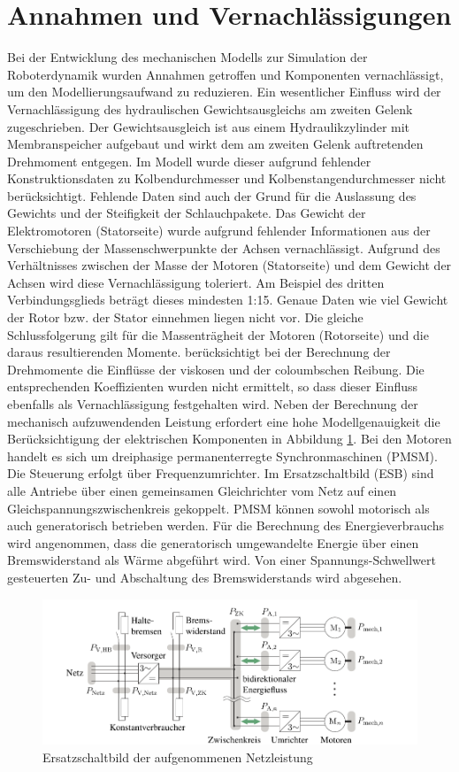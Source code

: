 \section{Annahmen und Vernachlässigungen}
Bei der Entwicklung des mechanischen Modells zur Simulation der Roboterdynamik wurden Annahmen getroffen und Komponenten vernachlässigt, um den Modellierungsaufwand zu reduzieren. Ein wesentlicher Einfluss wird der Vernachlässigung des hydraulischen Gewichtsausgleichs am zweiten Gelenk zugeschrieben. Der Gewichtsausgleich ist aus einem Hydraulikzylinder mit Membranspeicher aufgebaut und wirkt dem am zweiten Gelenk auftretenden Drehmoment entgegen. Im Modell wurde dieser aufgrund fehlender Konstruktionsdaten zu Kolbendurchmesser und Kolbenstangendurchmesser nicht berücksichtigt. Fehlende Daten sind auch der Grund für die Auslassung des Gewichts und der Steifigkeit der Schlauchpakete. Das Gewicht der Elektromotoren (Statorseite) wurde aufgrund fehlender Informationen aus der Verschiebung der Massenschwerpunkte der Achsen vernachlässigt. Aufgrund des Verhältnisses zwischen der Masse der Motoren (Statorseite) und dem Gewicht der Achsen  wird diese Vernachlässigung toleriert. Am Beispiel des dritten Verbindungsglieds beträgt dieses mindesten 1:15. Genaue Daten wie viel Gewicht der Rotor bzw. der Stator einnehmen liegen nicht vor.  Die gleiche Schlussfolgerung gilt für die Massenträgheit der Motoren (Rotorseite) und die daraus resultierenden Momente. \autocite[S.~287~f.]{Grimble.2009} berücksichtigt bei der Berechnung der Drehmomente die Einflüsse der viskosen und der coloumbschen Reibung. Die entsprechenden Koeffizienten wurden nicht ermittelt, so dass dieser Einfluss ebenfalls als Vernachlässigung festgehalten wird. Neben der Berechnung der mechanisch aufzuwendenden Leistung erfordert eine hohe Modellgenauigkeit die Berücksichtigung der elektrischen Komponenten in Abbildung \ref{fig:zk}. Bei den Motoren handelt es sich um dreiphasige permanenterregte Synchronmaschinen (PMSM).  Die Steuerung erfolgt über Frequenzumrichter. Im Ersatzschaltbild (ESB) sind alle Antriebe über einen gemeinsamen Gleichrichter vom Netz auf einen Gleichspannungszwischenkreis gekoppelt. PMSM können sowohl motorisch als auch generatorisch betrieben werden. Für die Berechnung des Energieverbrauchs wird angenommen, dass die generatorisch umgewandelte Energie über einen Bremswiderstand als Wärme abgeführt wird. Von einer Spannungs-Schwellwert gesteuerten Zu- und Abschaltung des Bremswiderstands wird abgesehen. \cite[S.~21~ff.]{Eggers.2019}
%
\begin{figure}[tbph]
	\centering
	\includegraphics[width=1\linewidth]{images/zk}
	\caption{Ersatzschaltbild der aufgenommenen Netzleistung \cite[S.~20]{Eggers.2019}}
	\label{fig:zk}
\end{figure}


